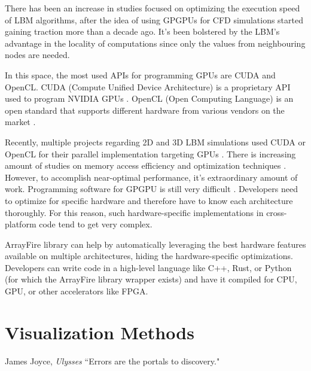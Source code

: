 There has been an increase in studies focused on optimizing the execution speed of LBM algorithms, after the idea of using GPGPUs for CFD simulations started gaining traction more than a decade ago. It's been bolstered by the LBM's advantage in the locality of computations since only the values from neighbouring nodes are needed. 

In this space, the most used APIs for programming GPUs are CUDA and OpenCL. CUDA (Compute Unified Device Architecture) is a proprietary API used to program NVIDIA GPUs \cite{stortiCUDAEngineersIntroduction2016}. OpenCL (Open Computing Language) is an open standard that supports different hardware from various vendors on the market \cite{karimiPerformanceComparisonCUDA}.

Recently, multiple projects regarding 2D and 3D LBM simulations used CUDA or OpenCL for their parallel implementation targeting GPUs \cite{delboscRealTimeSimulationIndoor, delboscOptimizedImplementationLattice2014,  januszewskiSailfishFlexibleMultiGPU2014, boroniFULLGPUImplementation2017, kotsalosDigitalBloodMassively2019, kolihaOnlineVisualizationInteractive2015, szokePerformanceEvaluationTwoDimensional2017, harwoodLUMAManycoreFluid2018, harwoodParallelisationInteractiveLatticeBoltzmann2017}. There is increasing amount of studies on memory access efficiency and optimization techniques \cite{herschlagGPUDataAccess2018, tranPerformanceOptimization3D2017}. However, to accomplish near-optimal performance, it's extraordinary amount of work. Programming software for GPGPU is still very difficult \cite{amalcolmArrayFireGPUAcceleration2012a}. Developers need to optimize for specific hardware and therefore have to know each architecture thoroughly. For this reason, such hardware-specific implementations in cross-platform code tend to get very complex.

ArrayFire library can help by automatically leveraging the best hardware features available on multiple architectures, hiding the hardware-specific optimizations. Developers can write code in a high-level language like C++, Rust, or Python (for which the ArrayFire library wrapper exists) and have it compiled for CPU, GPU, or other accelerators like FPGA.


\section{Visualization Methods}\label{sec:vizmethods}
\begin{chapquote}{James Joyce, \textit{Ulysses}}
	``Errors are the portals to discovery."
\end{chapquote}

